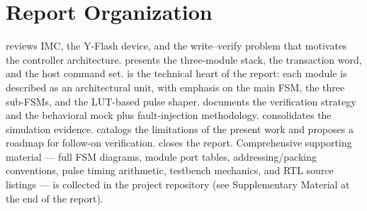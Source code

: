 \section{Report Organization}
\label{sec:intro-organization}

 reviews IMC, the Y-Flash device, and the
write--verify problem that motivates the controller architecture.
 presents the three-module stack, the transaction
word, and the host command set.  is the technical heart of
the report: each module is described as an architectural unit, with
emphasis on the main FSM, the three sub-FSMs, and the LUT-based pulse
shaper.  documents the verification strategy and
the behavioral mock plus fault-injection methodology.
 consolidates the simulation evidence.
 catalogs the limitations of the present work and
proposes a roadmap for follow-on verification. 
closes the report. Comprehensive supporting material --- full FSM
diagrams, module port tables, addressing/packing conventions, pulse
timing arithmetic, testbench mechanics, and RTL source listings --- is
collected in the project repository (see Supplementary Material at the
end of the report).
